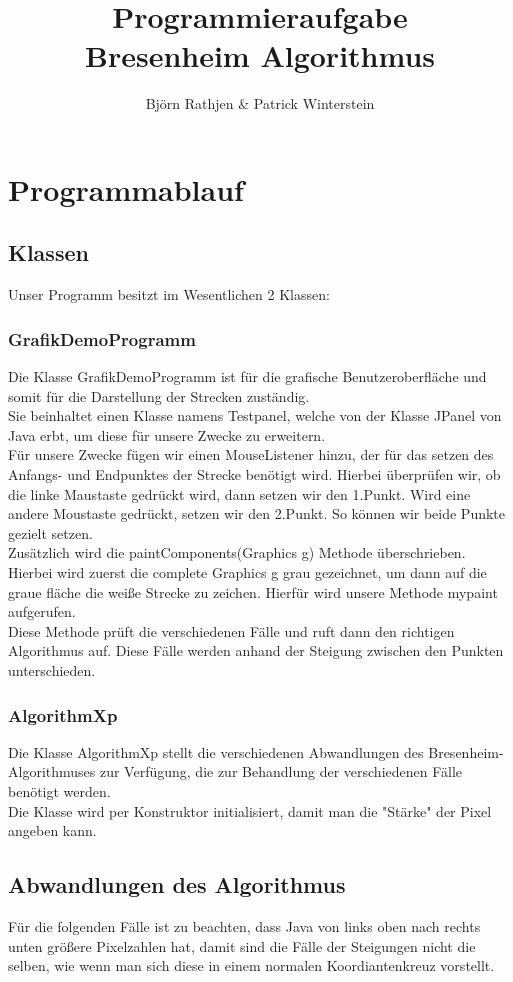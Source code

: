 \documentclass[a4paper,10pt]{article}
\title{Programmieraufgabe \\ Bresenheim Algorithmus}
\author{Björn Rathjen \& Patrick Winterstein}
\begin{document}
\maketitle
\newpage
\section{Programmablauf}
\subsection{Klassen}
Unser Programm besitzt im Wesentlichen 2 Klassen:
\subsubsection{GrafikDemoProgramm}
Die Klasse GrafikDemoProgramm ist für die grafische Benutzeroberfläche und somit für die Darstellung der Strecken zuständig.\\Sie beinhaltet einen Klasse namens Testpanel, welche von der Klasse JPanel von Java erbt, um diese für unsere Zwecke zu erweitern.\\Für unsere Zwecke fügen wir einen MouseListener hinzu, der für das setzen des Anfangs- und Endpunktes der Strecke benötigt wird. Hierbei überprüfen wir, ob die linke Maustaste gedrückt wird, dann setzen wir den 1.Punkt. Wird eine andere Moustaste gedrückt, setzen wir den 2.Punkt. So können wir beide Punkte gezielt setzen.\\Zusätzlich wird die paintComponents(Graphics g) Methode überschrieben. Hierbei wird zuerst die complete Graphics g grau gezeichnet, um dann auf die graue fläche die weiße Strecke zu zeichen. Hierfür wird unsere Methode mypaint aufgerufen.\\Diese Methode prüft die verschiedenen Fälle und ruft dann den richtigen Algorithmus auf. Diese Fälle werden anhand der Steigung zwischen den Punkten unterschieden.
\subsubsection{AlgorithmXp}
Die Klasse AlgorithmXp stellt die verschiedenen Abwandlungen des Bresenheim-Algorithmuses zur Verfügung, die zur Behandlung der verschiedenen Fälle benötigt werden.\\Die Klasse wird per Konstruktor initialisiert, damit man die "Stärke" der Pixel angeben kann.
\subsection{Abwandlungen des Algorithmus}
Für die folgenden Fälle ist zu beachten, dass Java von links oben nach rechts unten größere Pixelzahlen hat, damit sind die Fälle der Steigungen nicht die selben, wie wenn man sich diese in einem normalen Koordiantenkreuz vorstellt.
\newpage
\end{document}
